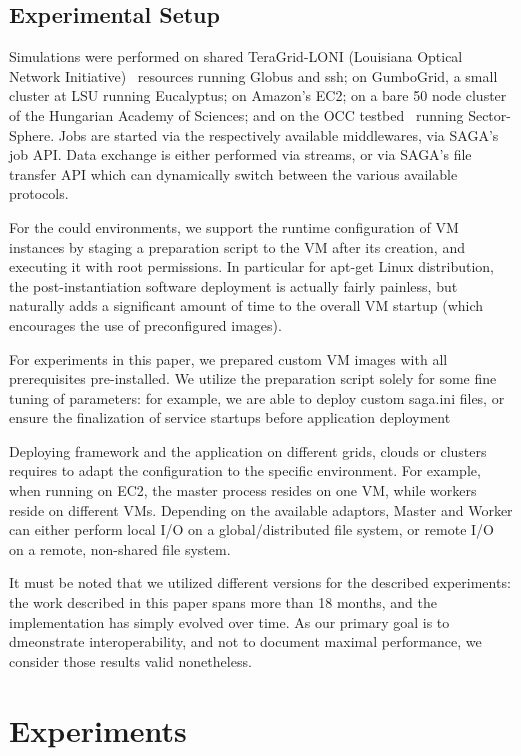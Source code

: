 \documentclass[3p,twocolumn]{elsarticle}
\begin{document}
\subsection{Experimental Setup}

Simulations were performed on shared TeraGrid-LONI (Louisiana Optical
Network Initiative)~\cite{loni-url} resources running Globus and ssh;
on GumboGrid, a small cluster at LSU running Eucalyptus; on Amazon's
EC2; on a bare 50 node cluster of the Hungarian Academy of Sciences;
and on the OCC testbed~\cite{occ_testbed} running Sector-Sphere.  Jobs
are started via the respectively available middlewares, via SAGA's job
API.  Data exchange is either performed via streams, or via SAGA's
file transfer API which can dynamically switch between the various
available protocols.

For the could environments, we support the runtime configuration of VM
instances by staging a preparation script to the VM after its
creation, and executing it with root permissions.  In particular for
apt-get Linux distribution, the post-instantiation software deployment
is actually fairly painless, but naturally adds a significant amount
of time to the overall VM startup (which encourages the use of
preconfigured images).

For experiments in this paper, we prepared custom VM images with all
prerequisites pre-installed.  We utilize the preparation script solely
for some fine tuning of parameters: for example, we are able to deploy
custom saga.ini files, or ensure the finalization of service startups
before application deployment

Deploying \sagamapreduce framework and the \wc application on
different grids, clouds or clusters requires to adapt the configuration
to the specific environment.  For example, when running \sagamapreduce
on EC2, the master process resides on one VM, while workers reside on
different VMs.  Depending on the available adaptors, Master and Worker
can either perform local I/O on a global/distributed file system, or
remote I/O on a remote, non-shared file system.

It must be noted that we utilized different \smr versions for the
described experiments: the work described in this paper spans more
than 18 months, and the \smr implementation has simply evolved over
time.  As our primary goal is to dmeonstrate interoperability, and not
to document maximal performance, we consider those results valid
nonetheless.


\section{Experiments} 
\label{sec:exp}
\end{document}
